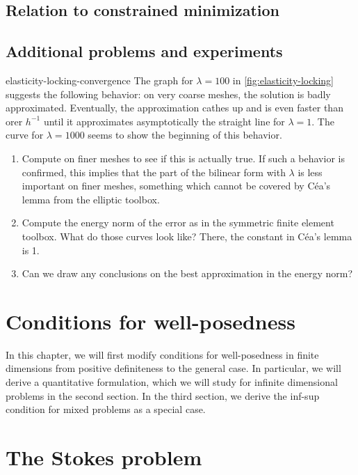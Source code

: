 \section{Relation to constrained minimization}


\section{Additional problems and experiments}

\begin{Problem}{elasticity-locking-convergence}
  The graph for $\lambda=100$ in \cref{fig:elasticity-locking}
  suggests the following behavior: on very coarse meshes, the solution
  is badly approximated. Eventually, the approximation cathes up and
  is even faster than orer $h^{-1}$ until it approximates
  asymptotically the straight line for $\lambda=1$. The curve for
  $\lambda=1000$ seems to show the beginning of this behavior.

  \begin{enumerate}
  \item Compute on finer meshes to see if this is actually true. If
    such a behavior is confirmed, this implies that the part of the
    bilinear form with $\lambda$ is less important on finer meshes,
    something which cannot be covered by Céa's lemma from the elliptic
    toolbox.
  \item Compute the energy norm of the error as in the symmetric
    finite element toolbox. What do those curves look like? There, the
    constant in Céa's lemma is 1.
  \item Can we draw any conclusions on the best approximation in the
    energy norm?
  \end{enumerate}
\end{Problem}

\chapter{Conditions for well-posedness}
\label{sec:mixed-wellposedness}
In this chapter, we will first modify conditions for well-posedness in
finite dimensions from positive definiteness to the general case. In
particular, we will derive a quantitative formulation, which we will
study for infinite dimensional problems in the second section. In the
third section, we derive the inf-sup condition for mixed problems as a
special case.


\chapter{The Stokes problem}
\label{cha:stokes}


